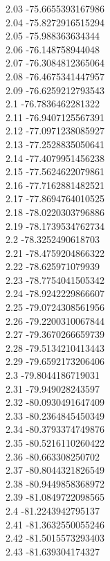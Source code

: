 {2.03	-75.6655393167986\\
2.04	-75.8272916515294\\
2.05	-75.988363634344\\
2.06	-76.148758944048\\
2.07	-76.3084812365064\\
2.08	-76.4675341447957\\
2.09	-76.6259212793543\\
2.1	-76.7836462281322\\
2.11	-76.9407125567391\\
2.12	-77.0971238085927\\
2.13	-77.2528835050641\\
2.14	-77.4079951456238\\
2.15	-77.5624622079861\\
2.16	-77.7162881482521\\
2.17	-77.8694764010525\\
2.18	-78.0220303796886\\
2.19	-78.1739534762734\\
2.2	-78.3252490618703\\
2.21	-78.4759204866322\\
2.22	-78.625971079939\\
2.23	-78.7754041505342\\
2.24	-78.9242229866607\\
2.25	-79.0724308561956\\
2.26	-79.2200310067844\\
2.27	-79.3670266659739\\
2.28	-79.5134210413443\\
2.29	-79.6592173206406\\
2.3	-79.8044186719031\\
2.31	-79.949028243597\\
2.32	-80.0930491647409\\
2.33	-80.2364845450349\\
2.34	-80.3793374749876\\
2.35	-80.5216110260422\\
2.36	-80.663308250702\\
2.37	-80.8044321826549\\
2.38	-80.9449858368972\\
2.39	-81.0849722098565\\
2.4	-81.2243942795137\\
2.41	-81.3632550055246\\
2.42	-81.5015573293403\\
2.43	-81.639304174327\\
}
